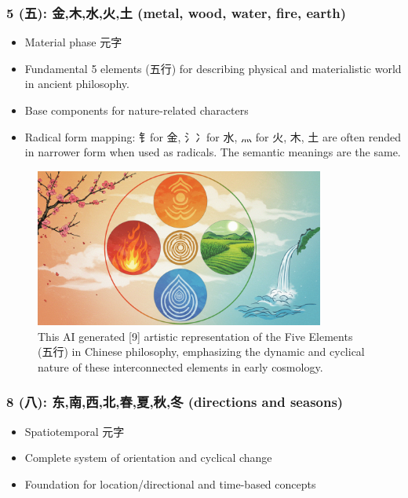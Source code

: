 \documentclass[11pt,letterpaper]{article}
\begin{document}
\subsubsection{5 (五): 金,木,水,火,土 (metal, wood, water, fire, earth)} 
  

  \begin{itemize}
  \tightlist
  \item
    Material phase 元字
  \item
    Fundamental 5 elements (五行) for describing physical and
    materialistic world in ancient philosophy.
  \item
    Base components for nature-related characters
  \item
    Radical form mapping: 钅for 金, 氵冫for 水, 灬 for 火, 木, 土 are
    often rended in narrower form when used as radicals. The semantic
    meanings are the same.
  \end{itemize}

\begin{figure}
\centering
\includegraphics[width=0.85\textwidth]{./images/five-elements.jpg}
\caption{This AI generated {[}9{]} artistic representation of the Five
Elements (五行) in Chinese philosophy, emphasizing the dynamic and
cyclical nature of these interconnected elements in early cosmology.}
\end{figure}

\subsubsection{8 (八): 东,南,西,北,春,夏,秋,冬 (directions and seasons)} 
  
  \begin{itemize}
  \tightlist
  \item
    Spatiotemporal 元字
  \item
    Complete system of orientation and cyclical change
  \item
    Foundation for location/directional and time-based concepts
  \end{itemize}
\end{document}
